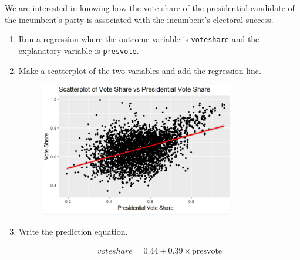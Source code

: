 \documentclass[12pt,letterpaper]{article}
\begin{document}
\noindent We are interested in knowing how the vote share of the presidential candidate of the incumbent's party is associated with the incumbent's electoral success.
	\vspace{.25cm}
	\begin{enumerate}
		\item Run a regression where the outcome variable is \texttt{voteshare} and the explanatory variable is \texttt{presvote}.	
	
		\item Make a scatterplot of the two variables and add the regression line. 	
		\begin{figure}[h]
			\centering
			\includegraphics[width=0.8\textwidth]{Question3.png}
		\end{figure}	
			\vspace{3cm}
		\item Write the prediction equation.
			
			\begin{align*}
				voteshare = 0.44 + 0.39 \times \text{presvote}
			\end{align*}
			
	\end{enumerate}
	
\end{document}
